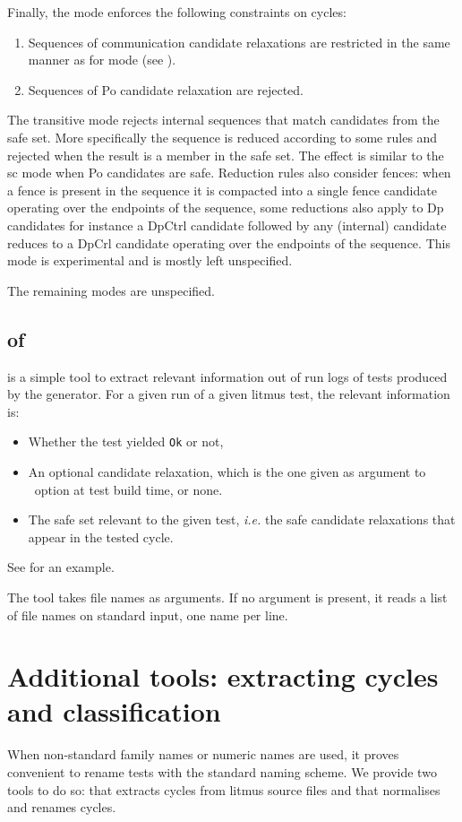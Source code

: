 \label{uni:def}Finally, the  mode enforces the following constraints
on cycles:
\begin{enumerate}
\item Sequences of communication  candidate relaxations
are restricted in the same manner as for
 mode (see ).
\item Sequences of Po candidate relaxation are rejected.
\end{enumerate}

\label{transitive:def}
The transitive mode rejects internal sequences that match candidates from the safe set. More specifically the sequence is reduced according to some rules and rejected when the result is a member in the safe set.
The effect is similar to the sc mode when Po candidates are safe. Reduction rules also consider fences: when a fence is present in the sequence it is compacted into a single fence candidate operating over the endpoints of the sequence, some reductions also apply to Dp candidates for instance a DpCtrl candidate followed by any (internal) candidate reduces to a DpCrl candidate operating over the endpoints of the sequence.
This mode is experimental and is mostly left unspecified.

The remaining modes are unspecified.

\subsection{ of \readRelax}
\readRelax{} is a simple tool to extract relevant information
out of \litmus{} run logs of tests produced by the \diy{} generator.
For a given run of a given litmus test, the relevant information is:
\begin{itemize}
\item Whether the test yielded \texttt{Ok} or not,
\item An optional candidate relaxation, which is the one
given as argument to \diy~option
 at test build time, or none.
\item The safe set relevant to the given test, \emph{i.e.}
the safe candidate relaxations that appear in the tested cycle.
\end{itemize}
See \mysec{\ref{readRelax:intro}} for an example.

The tool \readRelax{} takes file names as arguments.
If no argument is present, it reads a list
of file names on standard input, one name per line.

\section{Additional tools: extracting cycles and classification}
When non-standard family names or numeric names are used, it proves convenient
to rename tests with the standard naming scheme.
We provide two tools to do so: \mcycles{} that extracts cycles from
litmus source files and \classify{} that normalises and renames cycles.

